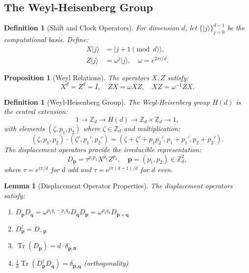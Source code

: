 \documentclass[a4paper,11pt]{article}
\newtheorem{definition}[theorem]{Definition}
\newtheorem{proposition}[theorem]{Proposition}
\newtheorem{lemma}[theorem]{Lemma}
\DeclareMathOperator{\Tr}{Tr}
\newcommand{\Z}{\mathbb{Z}}
\begin{document}
\subsection{The Weyl-Heisenberg Group}

\begin{definition}[Shift and Clock Operators]
For dimension $d$, let $\{|j\rangle\}_{j=0}^{d-1}$ be the computational basis. Define:
\begin{align}
X|j\rangle &= |j+1 \pmod d\rangle, \\
Z|j\rangle &= \omega^j|j\rangle, \quad \omega = e^{2\pi i/d}.
\end{align}
\end{definition}

\begin{proposition}[Weyl Relations]
The operators $X, Z$ satisfy:
\begin{equation}
X^d = Z^d = I, \quad ZX = \omega XZ, \quad XZ = \omega^{-1}ZX.
\end{equation}
\end{proposition}

\begin{definition}[Weyl-Heisenberg Group]
The Weyl-Heisenberg group $H(d)$ is the central extension:
\begin{equation}
1 \to \Z_d \to H(d) \to \Z_d \times \Z_d \to 1,
\end{equation}
with elements $(\zeta, p_1, p_2)$ where $\zeta \in \Z_d$ and multiplication:
\begin{equation}
(\zeta, p_1, p_2) \cdot (\zeta', p_1', p_2') = (\zeta + \zeta' + p_1 p_2', p_1 + p_1', p_2 + p_2').
\end{equation}
The displacement operators provide the irreducible representation:
\begin{equation}
D_\mathbf{p} = \tau^{p_1 p_2} X^{p_1} Z^{p_2}, \quad \mathbf{p} = (p_1, p_2) \in \Z_d^2,
\end{equation}
where $\tau = e^{i\pi/d}$ for $d$ odd and $\tau = e^{i\pi(d+1)/d}$ for $d$ even.
\end{definition}

\begin{lemma}[Displacement Operator Properties]\label{lem:displacement}
The displacement operators satisfy:
\begin{enumerate}[label=(\roman*)]
    \item $D_\mathbf{p} D_\mathbf{q} = \omega^{p_2 q_1 - p_1 q_2} D_\mathbf{q} D_\mathbf{p} = \omega^{p_2 q_1} D_{\mathbf{p}+\mathbf{q}}$
    \item $D_\mathbf{p}^\dagger = D_{-\mathbf{p}}$
    \item $\Tr(D_\mathbf{p}) = d \cdot \delta_{\mathbf{p}, \mathbf{0}}$
    \item $\frac{1}{d}\Tr(D_\mathbf{p}^\dagger D_\mathbf{q}) = \delta_{\mathbf{p},\mathbf{q}}$ (orthogonality)
\end{enumerate}
\end{lemma}
\end{document}
